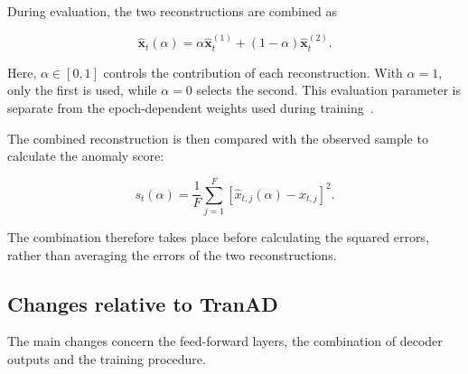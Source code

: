 During evaluation, the two reconstructions are combined as

\begin{equation}
  \widehat{\mathbf{x}}_t(\alpha) =
  \alpha\widehat{\mathbf{x}}^{(1)}_t
  +(1-\alpha)\widehat{\mathbf{x}}^{(2)}_t.
  \label{eq:background-tranadplus-combination}
\end{equation}

Here, $\alpha\in[0,1]$ controls the contribution of each
reconstruction. With $\alpha=1$, only the first is used,
while $\alpha=0$ selects the second.
This evaluation parameter is separate from the epoch-dependent
weights used during training~\cite{TranADPlusReferenceCode}.

The combined reconstruction is then compared with the observed
sample to calculate the anomaly score:

\begin{equation}
  s_t(\alpha)=\frac{1}{F}\sum_{j=1}^{F}
  \left[\widehat{x}_{t,j}(\alpha)-x_{t,j}\right]^2.
  \label{eq:background-tranadplus-score}
\end{equation}

The combination therefore takes place before calculating
the squared errors, rather than averaging the errors
of the two reconstructions.

\subsection{Changes relative to TranAD}
\label{sec:background-tranadplus-changes}

The main changes concern the feed-forward layers, the combination
of decoder outputs and the training procedure.

